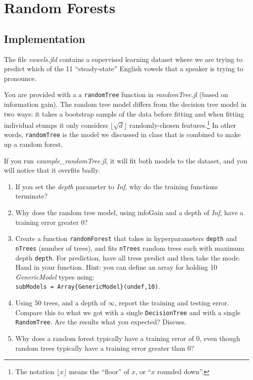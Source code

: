 \documentclass{article}
\def\blu#1{{\color{blu}#1}}
\def\enum#1{\begin{enumerate}#1\end{enumerate}}
\begin{document}
\section{Random Forests}

 
 \subsection{Implementation}
 
The file \emph{vowels.jld} contains a supervised learning dataset where we are trying to predict which of the 11 ``steady-state'' English vowels that a speaker is trying to pronounce.

You are provided with a a \texttt{randomTree} function in \emph{randomTree.jl} (based on information gain). The random tree model differs from the decision tree model in two ways: 
it takes a bootstrap sample of the data before fitting and when fitting individual stumps it only considers $\lfloor \sqrt{d} \rfloor$ randomly-chosen features.\footnote{The notation $\lfloor x\rfloor$ means the ``floor'' of $x$, or ``$x$ rounded down''.}  
In other words, \texttt{randomTree} is the model we discussed in class that is combined to make up a random forest.

If you run \emph{example\_randomTree.jl}, it will fit both models to the dataset, and you will notice that it overfits badly.

\blu{
\enum{
\item If you set the \emph{depth} parameter to \emph{Inf}, why do the training functions terminate?
\item Why does the random tree model, using infoGain and a depth of \emph{Inf}, have a training error greater 0?
\item Create a function \texttt{randomForest} that takes in hyperparameters \texttt{depth} and \texttt{nTrees} (number of trees), and 
fits \texttt{nTrees} random trees each with maximum depth \texttt{depth}. For prediction, have all trees predict and then take the mode. Hand in your function. Hint: you can define an array for holding 10 \emph{GenericModel} types using:\\
\texttt{subModels = Array\{GenericModel\}(undef,10)}.
\item Using 50 trees, and a depth of $\infty$, report the training and testing error. Compare this to what we got with a single \texttt{DecisionTree} and with a single \texttt{RandomTree}. Are the results what you expected? Discuss. 
\item Why does a random forest typically have a training error of 0, even though random trees typically have a training error greater than 0?
}
}
\end{document}
